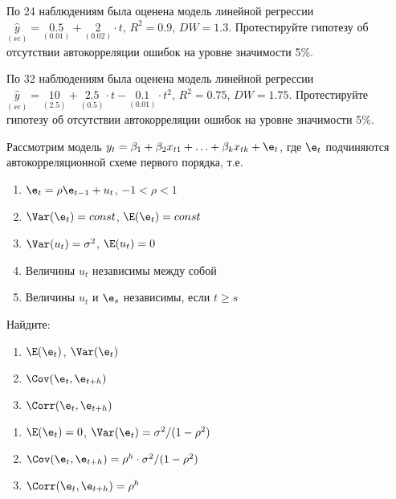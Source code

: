 \documentclass[pdftex,11pt,openany]{book}\usepackage[]{graphicx}\usepackage[]{color}
\begin{document}
\begin{solution}
\end{solution}



\begin{problem}
По 24 наблюдениям была оценена модель линейной регрессии
$\underset{(se)}{\hat{y}}=\underset{(0.01)}{0.5}+\underset{(0.02)}{2}\cdot t$, $R^2=0.9$, $DW=1.3$. Протестируйте гипотезу об отсутствии автокорреляции ошибок на уровне значимости 5\%.
\end{problem}

\begin{solution}
\end{solution}


\begin{problem}
По 32 наблюдениям была оценена модель линейной регрессии
$\underset{(se)}{\hat{y}}=\underset{(2.5)}{10}+\underset{(0.5)}{2.5}\cdot t- \underset{(0.01)}{0.1}\cdot t^2$, $R^2=0.75$, $DW=1.75$. Протестируйте гипотезу об отсутствии автокорреляции ошибок на уровне значимости 5\%.
\end{problem}

\begin{solution}
\end{solution}


\begin{problem}
Рассмотрим модель $y_t=\beta_1+\beta_2 x_{t1}+\ldots+\beta_k x_{tk}+\e_t$, где $\e_t$ подчиняются автокорреляционной схеме первого порядка, т.е.
\begin{enumerate}
\item $\e_t=\rho \e_{t-1}+u_t$, $-1<\rho<1$
\item $\Var(\e_t)=const$, $\E(\e_t)=const$
\item $\Var(u_t)=\sigma^2$, $\E(u_t)=0$
\item Величины $u_t$ независимы между собой
\item Величины $u_t$ и $\e_s$ независимы, если $t\geq s$
\end{enumerate}
Найдите:
\begin{enumerate}
\item $\E(\e_t)$, $\Var(\e_t)$
\item $\Cov(\e_t,\e_{t+h})$
\item $\Corr(\e_t,\e_{t+h})$
\end{enumerate}
\end{problem}

\begin{solution}
\begin{enumerate}
\item $\E(\e_t)=0$, $\Var(\e_t)=\sigma^2/(1-\rho^2)$
\item $\Cov(\e_t,\e_{t+h})=\rho^h\cdot \sigma^2/(1-\rho^2)$
\item $\Corr(\e_t,\e_{t+h})=\rho^h$
\end{enumerate}
\end{solution}
\end{document}
